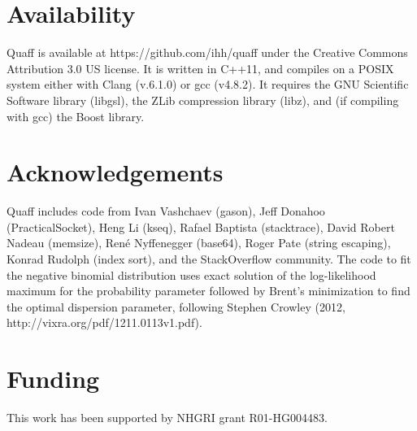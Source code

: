 \documentclass{bioinfo}
\begin{document}
\section{Availability}

Quaff is available at https://github.com/ihh/quaff under the Creative Commons Attribution 3.0 US license. It is written in C++11, and compiles on a POSIX system either with Clang (v.6.1.0) or gcc (v4.8.2). It requires the GNU Scientific Software library (libgsl), the ZLib compression library (libz), and (if compiling with gcc) the Boost library.




\section*{Acknowledgements}

Quaff includes code from Ivan Vashchaev (gason), Jeff Donahoo (PracticalSocket), Heng Li (kseq), Rafael Baptista (stacktrace), David Robert Nadeau (memsize), Ren\'{e} Nyffenegger (base64), Roger Pate (string escaping), Konrad Rudolph (index sort), and the StackOverflow community. The code to fit the negative binomial distribution uses exact solution of the log-likelihood maximum for the probability parameter followed by Brent's minimization to find the optimal dispersion parameter, following Stephen Crowley (2012, http://vixra.org/pdf/1211.0113v1.pdf).

\section*{Funding}

This work has been supported by NHGRI grant R01-HG004483.


%
%
%
%
%
%
%
%



\end{document}
